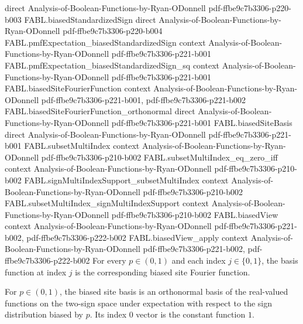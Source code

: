 \begin{theorem}
  {direct}
  {Analysis-of-Boolean-Functions-by-Ryan-ODonnell}
  {pdf-ffbe9c7b3306-p220-b003}
\proofstep
  {FABL.biasedStandardizedSign}
  {direct}
  {Analysis-of-Boolean-Functions-by-Ryan-ODonnell}
  {pdf-ffbe9c7b3306-p220-b004}
\proofstep
  {FABL.pmfExpectation_biasedStandardizedSign}
  {context}
  {Analysis-of-Boolean-Functions-by-Ryan-ODonnell}
  {pdf-ffbe9c7b3306-p221-b001}
\proofstep
  {FABL.pmfExpectation_biasedStandardizedSign_sq}
  {context}
  {Analysis-of-Boolean-Functions-by-Ryan-ODonnell}
  {pdf-ffbe9c7b3306-p221-b001}
\proofstep
  {FABL.biasedSiteFourierFunction}
  {context}
  {Analysis-of-Boolean-Functions-by-Ryan-ODonnell}
  {pdf-ffbe9c7b3306-p221-b001,
    pdf-ffbe9c7b3306-p221-b002}
\proofstep
  {FABL.biasedSiteFourierFunction_orthonormal}
  {direct}
  {Analysis-of-Boolean-Functions-by-Ryan-ODonnell}
  {pdf-ffbe9c7b3306-p221-b001}
\proofstep
  {FABL.biasedSiteBasis}
  {direct}
  {Analysis-of-Boolean-Functions-by-Ryan-ODonnell}
  {pdf-ffbe9c7b3306-p221-b001}
\proofstep
  {FABL.subsetMultiIndex}
  {context}
  {Analysis-of-Boolean-Functions-by-Ryan-ODonnell}
  {pdf-ffbe9c7b3306-p210-b002}
\proofstep
  {FABL.subsetMultiIndex_eq_zero_iff}
  {context}
  {Analysis-of-Boolean-Functions-by-Ryan-ODonnell}
  {pdf-ffbe9c7b3306-p210-b002}
\proofstep
  {FABL.signMultiIndexSupport_subsetMultiIndex}
  {context}
  {Analysis-of-Boolean-Functions-by-Ryan-ODonnell}
  {pdf-ffbe9c7b3306-p210-b002}
\proofstep
  {FABL.subsetMultiIndex_signMultiIndexSupport}
  {context}
  {Analysis-of-Boolean-Functions-by-Ryan-ODonnell}
  {pdf-ffbe9c7b3306-p210-b002}
\proofstep
  {FABL.biasedView}
  {context}
  {Analysis-of-Boolean-Functions-by-Ryan-ODonnell}
  {pdf-ffbe9c7b3306-p221-b002,
    pdf-ffbe9c7b3306-p222-b002}
\proofstep
  {FABL.biasedView_apply}
  {context}
  {Analysis-of-Boolean-Functions-by-Ryan-ODonnell}
  {pdf-ffbe9c7b3306-p221-b002,
    pdf-ffbe9c7b3306-p222-b002}
For every $p\in(0,1)$ and each index $j\in\{0,1\}$, the basis function at index $j$ is
the corresponding biased site Fourier function.
\end{theorem}

\begin{definition}
\label{FABL.biasedSiteFourierBasis}
\leanok
{}
For $p\in(0,1)$, the biased site basis is an orthonormal basis of the real-valued
functions on the two-sign space under expectation with respect to the sign distribution
biased by $p$. Its index $0$ vector is the constant function $1$.
\end{definition}

